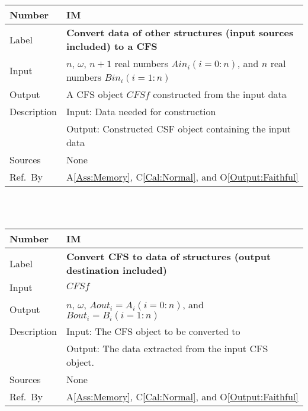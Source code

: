 \documentclass[12pt]{article}
\newcommand{\colAwidth}{0.13\textwidth}
\newcommand{\colBwidth}{0.82\textwidth}
\newcommand{\aref}[1]{A\ref{#1}}
\newcommand{\calref}[1]{C\ref{#1}}
\newcommand{\oref}[1]{O\ref{#1}}
\newcounter{instnum} %
\begin{document}
\noindent
\begin{minipage}{\textwidth}
	\renewcommand*{\arraystretch}{1.5}
	\begin{tabular}{| p{\colAwidth} | p{\colBwidth}|}
		\hline
		\rowcolor[gray]{0.9}
		Number& IM{instnum}\theinstnum 
		\label{IM:ConvertTo}\\
		\hline
		Label& \bf Convert data of other structures 
		(input sources included) to a CFS \\
		\hline
		Input& $n$, $\omega$, $n+1$ real numbers $\mathit{Ain}_{i} 
		(i=0:n)$, and $n$ real numbers $\mathit{Bin}_{i} (i=1:n)$\\
		\hline
		Output& A CFS object $\mathit{CFSf}$ constructed from 
		the input data\\
		\hline
		Description&Input: Data needed for construction\\
		&Output: Constructed CSF object containing the input data\\
		\hline
		Sources&None		\\
		\hline
		Ref.\ By &  \aref{Ass:Memory}, \calref{Cal:Normal}, 
		and \oref{Output:Faithful}\\
		\hline
	\end{tabular}
\end{minipage}\\
~\newline

\noindent
\begin{minipage}{\textwidth}
	\renewcommand*{\arraystretch}{1.5}
	\begin{tabular}{| p{\colAwidth} | p{\colBwidth}|}
		\hline
		\rowcolor[gray]{0.9}
		Number& IM{instnum}\theinstnum 
		\label{IM:ConvertFrom}\\
		\hline
		Label& \bf Convert CFS to data of structures 
		(output destination included) \\
		\hline
		Input& $\mathit{CFSf}$\\
		\hline
		Output& $n$, $\omega$, $\mathit{Aout}_{i}=A_i (i=0:n)$, 
		and $\mathit{Bout}_{i}=B_i (i=1:n)$\\
		\hline
		Description&Input: The CFS object to be converted to\\
		&Output: The data extracted from the input CFS object.\\
		\hline
		Sources&None\\
		\hline
		Ref.\ By &   \aref{Ass:Memory}, \calref{Cal:Normal}, 
		and \oref{Output:Faithful}\\
		\hline
	\end{tabular}
\end{minipage}\\
~\newline
\end{document}
